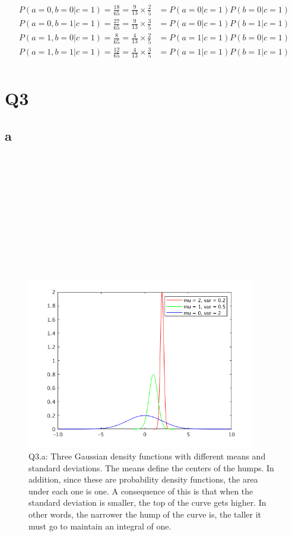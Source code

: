 \documentclass{article}
\begin{document}
\begin{align*}
    P(a = 0, b = 0 | c = 1) = \frac{18}{65} = \frac{9}{13} \times \frac{2}{5} &= P(a = 0 | c = 1) P(b = 0 | c = 1) \\
    P(a = 0, b = 1 | c = 1) = \frac{27}{65} = \frac{9}{13} \times \frac{3}{5} &= P(a = 0 | c = 1) P(b = 1 | c = 1) \\
    P(a = 1, b = 0 | c = 1) = \frac{8}{65} = \frac{4}{13} \times \frac{2}{5} &= P(a = 1 | c = 1) P(b = 0 | c = 1) \\
    P(a = 1, b = 1 | c = 1) = \frac{12}{65} = \frac{4}{13} \times \frac{3}{5} &= P(a = 1 | c = 1) P(b = 1 | c = 1) \\
\end{align*}

\section{Q3}

\subsection{a}

~\\
~\\
~\\
~\\
~\\
~\\
~\\
~\\
~\\
~\\

\begin{figure}[!ht]
	\centering
	\includegraphics[width=100mm]{three-gaussians.png}
	\caption{Q3.a: Three Gaussian density functions with different means and standard 
deviations. The means define the centers of the humps. In addition, since these 
are probability density functions, the area under each one is one. A 
consequence of this is that when the standard deviation is smaller, the top of 
the curve gets higher. In other words, the narrower the hump of the curve is, 
the taller it must go to maintain an integral of one.}
\end{figure}
\end{document}

